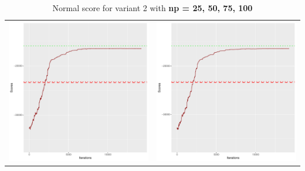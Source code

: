 \documentclass[]{scrartcl}
\begin{document}
\begin{table}[h!]
\begin{tabular}{cc}
\includegraphics[scale = 0.4]{./figs/win95pts/v2/75/boundsEvolution-14252.pdf} & 
\includegraphics[scale = 0.4]{./figs/win95pts/v2/100/boundsEvolution-14252.pdf} \\
\end{tabular}
\caption{Normal score for variant 2 with \textbf{np =  25, 50, 75, 100}}
\end{table}
\end{document}
